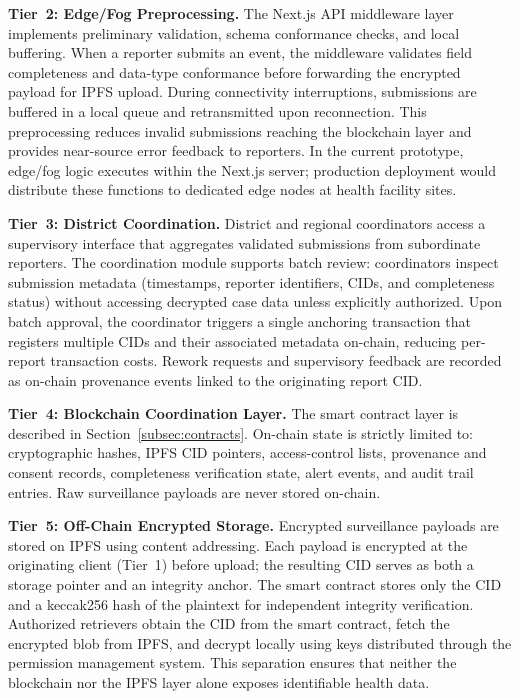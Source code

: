 \textbf{Tier~2: Edge/Fog Preprocessing.} The Next.js API middleware layer implements preliminary validation, schema conformance checks, and local buffering. When a reporter submits an event, the middleware validates field completeness and data-type conformance before forwarding the encrypted payload for IPFS upload. During connectivity interruptions, submissions are buffered in a local queue and retransmitted upon reconnection. This preprocessing reduces invalid submissions reaching the blockchain layer and provides near-source error feedback to reporters. In the current prototype, edge/fog logic executes within the Next.js server; production deployment would distribute these functions to dedicated edge nodes at health facility sites.

\textbf{Tier~3: District Coordination.} District and regional coordinators access a supervisory interface that aggregates validated submissions from subordinate reporters. The coordination module supports batch review: coordinators inspect submission metadata (timestamps, reporter identifiers, CIDs, and completeness status) without accessing decrypted case data unless explicitly authorized. Upon batch approval, the coordinator triggers a single anchoring transaction that registers multiple CIDs and their associated metadata on-chain, reducing per-report transaction costs. Rework requests and supervisory feedback are recorded as on-chain provenance events linked to the originating report CID.

\textbf{Tier~4: Blockchain Coordination Layer.} The smart contract layer is described in Section~\ref{subsec:contracts}. On-chain state is strictly limited to: cryptographic hashes, IPFS CID pointers, access-control lists, provenance and consent records, completeness verification state, alert events, and audit trail entries. Raw surveillance payloads are never stored on-chain.

\textbf{Tier~5: Off-Chain Encrypted Storage.} Encrypted surveillance payloads are stored on IPFS using content addressing. Each payload is encrypted at the originating client (Tier~1) before upload; the resulting CID serves as both a storage pointer and an integrity anchor. The smart contract stores only the CID and a keccak256 hash of the plaintext for independent integrity verification. Authorized retrievers obtain the CID from the smart contract, fetch the encrypted blob from IPFS, and decrypt locally using keys distributed through the permission management system. This separation ensures that neither the blockchain nor the IPFS layer alone exposes identifiable health data.

